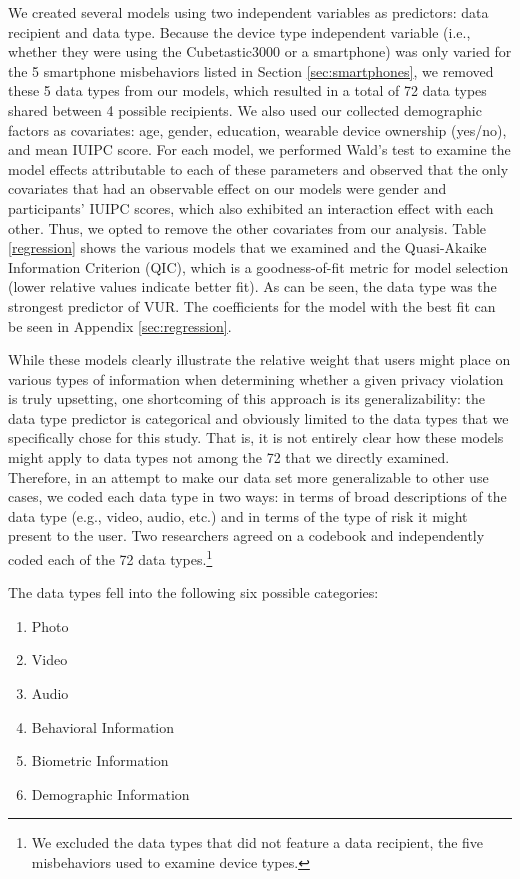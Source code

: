 We created several models using two independent variables as predictors: data recipient and data type. Because the device type independent variable (i.e., whether they were using the Cubetastic3000 or a smartphone) was only varied for the 5 smartphone misbehaviors listed in Section \ref{sec:smartphones}, we removed these 5 data types from our models, which resulted in a total of 72 data types shared between 4 possible recipients. We also used our collected demographic factors as covariates: age, gender, education, wearable device ownership (yes/no), and mean IUIPC score. For each model, we performed Wald's test to examine the model effects attributable to each of these parameters and observed that the only covariates that had an observable effect on our models were gender and participants' IUIPC scores, which also exhibited an interaction effect with each other. Thus, we opted to remove the other covariates from our analysis. Table \ref{regression} shows the various models that we examined and the Quasi-Akaike Information Criterion (QIC), which is a goodness-of-fit metric for model selection (lower relative values indicate better fit). As can be seen, the data type was the strongest predictor of VUR. The coefficients for the model with the best fit can be seen in Appendix \ref{sec:regression}.

While these models clearly illustrate  the relative weight that users might place on various types of information when determining whether a given privacy violation is truly upsetting, one shortcoming of this approach is its generalizability: the data type predictor is categorical and obviously limited to the data types that we specifically chose for this study. That is, it is not entirely clear how these models might apply to data types not among the 72 that we directly examined. Therefore, in an attempt to make our data set more generalizable to other use cases, we coded each data type in two ways: in terms of broad descriptions of the data type (e.g., video, audio, etc.) and in terms of the type of risk it might present to the user. Two researchers agreed on a codebook and independently coded each of the 72 data types.\footnote{We excluded the data types that did not feature a data recipient, the five misbehaviors used to examine device types.}

The data types fell into the following six possible categories:
\begin{enumerate}[topsep=0pt,itemsep=-1ex,partopsep=1ex,parsep=1ex]
\item Photo
\item Video
\item Audio
\item Behavioral Information
\item Biometric Information
\item Demographic Information
\end{enumerate}

